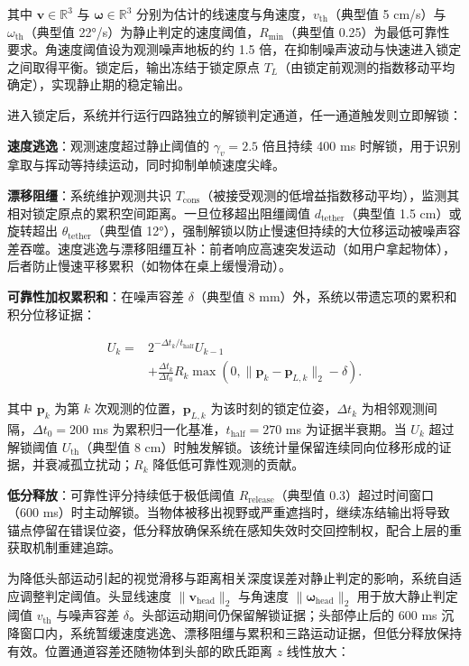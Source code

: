 \documentclass[review]{vgtc}
\begin{document}
其中 $\mathbf{v} \in \mathbb{R}^3$ 与 $\mathbf{\omega} \in \mathbb{R}^3$ 分别为估计的线速度与角速度，$v_{\mathrm{th}}$（典型值 5 cm/s）与 $\omega_{\mathrm{th}}$（典型值 22°/s）为静止判定的速度阈值，$R_{\mathrm{min}}$（典型值 0.25）为最低可靠性要求。角速度阈值设为观测噪声地板的约 1.5 倍，在抑制噪声波动与快速进入锁定之间取得平衡。锁定后，输出冻结于锁定原点 $T_L$（由锁定前观测的指数移动平均确定），实现静止期的稳定输出。

进入锁定后，系统并行运行四路独立的解锁判定通道，任一通道触发则立即解锁：

\textbf{速度逃逸}：观测速度超过静止阈值的 $\gamma_v = 2.5$ 倍且持续 400 ms 时解锁，用于识别拿取与挥动等持续运动，同时抑制单帧速度尖峰。

\textbf{漂移阻缰}：系统维护观测共识 $T_{\mathrm{cons}}$（被接受观测的低增益指数移动平均），监测其相对锁定原点的累积空间距离。一旦位移超出阻缰阈值 $d_{\mathrm{tether}}$（典型值 1.5 cm）或旋转超出 $\theta_{\mathrm{tether}}$（典型值 12°），强制解锁以防止慢速但持续的大位移运动被噪声容差吞噬。速度逃逸与漂移阻缰互补：前者响应高速突发运动（如用户拿起物体），后者防止慢速平移累积（如物体在桌上缓慢滑动）。

\textbf{可靠性加权累积和}：在噪声容差 $\delta$（典型值 8 mm）外，系统以带遗忘项的累积和积分位移证据：

\begin{equation}
\begin{aligned}
U_k ={}& 2^{-\Delta t_k/t_{\mathrm{half}}}U_{k-1} \\
&+ \frac{\Delta t_k}{\Delta t_0}R_k
\max\!\left(0,\lVert \mathbf{p}_k-\mathbf{p}_{L,k}\rVert_2-\delta\right).
\end{aligned}
\label{eq:cusum}
\end{equation}


其中 $\mathbf{p}_k$ 为第 $k$ 次观测的位置，$\mathbf{p}_{L,k}$ 为该时刻的锁定位姿，$\Delta t_k$ 为相邻观测间隔，$\Delta t_0 = 200$ ms 为累积归一化基准，$t_{\mathrm{half}} = 270$ ms 为证据半衰期。当 $U_k$ 超过解锁阈值 $U_{\mathrm{th}}$（典型值 8 cm）时触发解锁。该统计量保留连续同向位移形成的证据，并衰减孤立扰动；$R_k$ 降低低可靠性观测的贡献。

\textbf{低分释放}：可靠性评分持续低于极低阈值 $R_{\mathrm{release}}$（典型值 0.3）超过时间窗口（600 ms）时主动解锁。当物体被移出视野或严重遮挡时，继续冻结输出将导致锚点停留在错误位姿，低分释放确保系统在感知失效时交回控制权，配合上层的重获取机制重建追踪。

为降低头部运动引起的视觉滑移与距离相关深度误差对静止判定的影响，系统自适应调整判定阈值。头显线速度 $\lVert \mathbf{v}_{\mathrm{head}} \rVert_2$ 与角速度 $\lVert \mathbf{\omega}_{\mathrm{head}} \rVert_2$ 用于放大静止判定阈值 $v_{\mathrm{th}}$ 与噪声容差 $\delta$。头部运动期间仍保留解锁证据；头部停止后的 600 ms 沉降窗口内，系统暂缓速度逃逸、漂移阻缰与累积和三路运动证据，但低分释放保持有效。位置通道容差还随物体到头部的欧氏距离 $z$ 线性放大：
\end{document}
